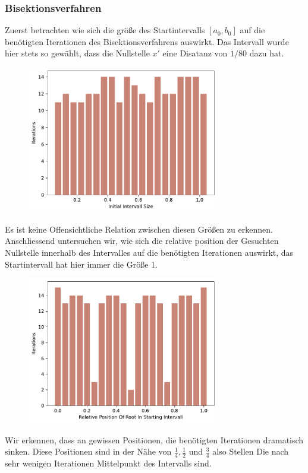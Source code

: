 \documentclass[a4paper,12pt]{article}
\newcommand{\1}{1\hspace{-0,9ex}1}
\begin{document}
\subsubsection*{Bisektionsverfahren}
Zuerst betrachten wie sich die größe des Startintervalls $[a_0, b_0]$ auf die benötigten Iterationen des Bisektionsverfahrens auswirkt. Das Intervall wurde hier stets so gewählt, dass die Nullstelle $x'$ eine Disatanz von $1/80$ dazu hat.
\begin{figure}[!h]
	\centering
	\includegraphics[width=0.75\textwidth]{plots/bisection_iterations_by_intervall_size.pdf}
\end{figure}
Es ist keine Offensichtliche Relation zwischen diesen Größen zu erkennen. Anschliessend untersuchen wir, wie sich die relative position der Gesuchten Nullstelle innerhalb des Intervalles auf die benötigten Iterationen auswirkt, das Startintervall hat hier immer die Größe 1.
\begin{figure}[!h]
	\centering
	\includegraphics[width=0.75\textwidth]{plots/bisection_iterations_by_relative_position_of_root.pdf}
\end{figure}
Wir erkennen, dass an gewissen Positionen, die benötigten Iterationen dramatisch sinken. Diese Positionen sind in der Nähe von $\frac{1}{4}, \frac{1}{2}$ und $\frac{3}{4}$ also Stellen Die nach sehr wenigen Iterationen Mittelpunkt des Intervalls sind.
\end{document}

